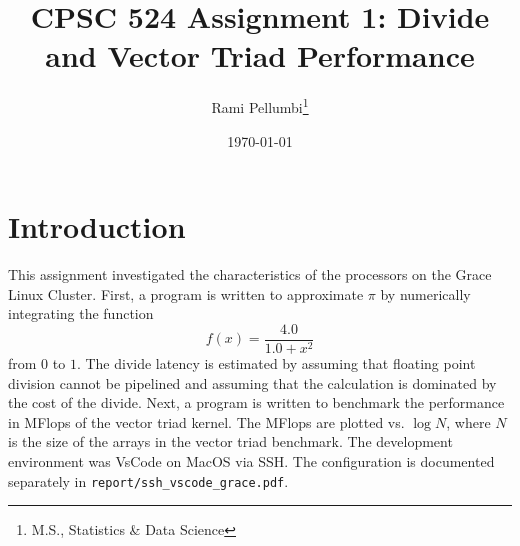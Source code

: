 \documentclass{article}
\title{CPSC 524 Assignment 1: Divide and Vector Triad Performance}
\author{Rami Pellumbi\thanks{M.S., Statistics \& Data Science}}
\date{\today}
\begin{document}
\maketitle

\newpage 

\section{Introduction}
This assignment investigated the characteristics of the processors on the Grace 
Linux Cluster. First, a program is written to approximate $\pi$ by numerically 
integrating the function 
$$f(x) = \frac{4.0}{1.0 + x^2}$$
from $0$ to $1$. The divide latency is estimated by assuming that floating point 
division cannot be pipelined and assuming that the calculation is dominated by 
the cost of the divide. Next, a program is written to benchmark the performance 
in MFlops of the vector triad kernel. The MFlops are plotted vs. $\log N$, where 
$N$ is the size of the arrays in the vector triad benchmark. The development 
environment was VsCode on MacOS via SSH. The configuration is documented separately 
in \texttt{report/ssh\_vscode\_grace.pdf}.
\end{document}
